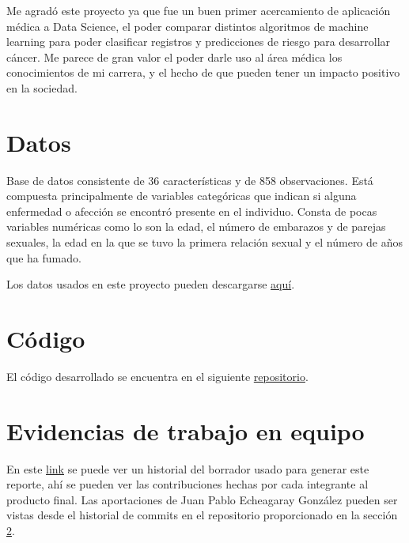 \documentclass[journal]{IEEEtran}                                                          %
\begin{document}
            Me agradó este proyecto ya que fue un buen primer acercamiento de aplicación médica a Data Science, el poder comparar distintos algoritmos de machine learning para poder clasificar registros y predicciones de riesgo para desarrollar cáncer. Me parece de gran valor el poder darle uso al área médica los conocimientos de mi carrera, y el hecho de que pueden tener un impacto positivo en la sociedad.
        
    \appendices
    
    \section{Datos} \label{data}
        
        Base de datos consistente de 36 características y de 858 observaciones. Está compuesta principalmente de variables categóricas que indican si alguna enfermedad o afección se encontró presente en el individuo. Consta de pocas variables numéricas como lo son la edad, el número de embarazos y de parejas sexuales, la edad en la que se tuvo la primera relación sexual y el número de años que ha fumado.
            
        Los datos usados en este proyecto pueden descargarse \href{https://www.kaggle.com/code/ravaliraj/risk-classification-of-cervical-cancer}{aquí}.

    \section{Código}\label{repo}

        El código desarrollado se encuentra en el siguiente \href{https://github.com/JuanEcheagaray75/cancer-clf}{repositorio}.
    \section{Evidencias de trabajo en equipo}
        
        En este \href{https://docs.google.com/document/d/1febGMKH0Z8mdPzhVf\_FTBrOR3ENYA2iGw5Lfeg8XTjk/edit?usp=sharing}{link} se puede ver un historial del borrador usado para generar este reporte, ahí se pueden ver las contribuciones hechas por cada integrante al producto final. Las aportaciones de Juan Pablo Echeagaray González pueden ser vistas desde el historial de commits en el repositorio proporcionado en la sección \ref{repo}.

    
    
\end{document}
